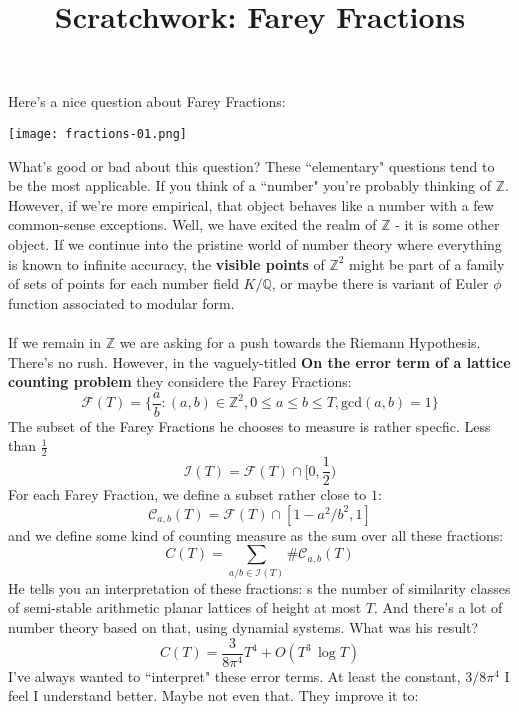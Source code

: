 \documentclass[12pt]{article}
\title{Scratchwork: Farey Fractions}
\date{}
\begin{document}

\sffamily

\maketitle

\noindent Here's a nice question about Farey Fractions:

\newpage

\texttt{[image: fractions-01.png]} 

\newpage

\noindent What's good or bad about this question?  These ``elementary" questions tend to be the most applicable.  If you think of a ``number" you're probably thinking of $\mathbb{Z}$.  However, if we're more empirical, that object behaves like a number with a few common-sense exceptions.  Well, we have exited the realm of $\mathbb{Z}$ - it is some other object.  If we continue into the pristine world of number theory where everything is known to infinite accuracy, the \textbf{visible points} of $\mathbb{Z}^2$ might be part of a family of  sets of points for each number field $K/\mathbb{Q}$, or maybe there is variant of Euler $\phi$ function associated to modular form.  \\ \\
If we remain in $\mathbb{Z}$ we are asking for a push towards the Riemann Hypothesis.  There's no rush.  However, in the vaguely-titled \textbf{On the error term of a lattice counting problem} they considere the Farey Fractions:
$$ \mathcal{F}(T) = \{ \frac{a}{b}: (a,b) \in \mathbb{Z}^2 , 0 \leq a \leq b \leq T , \mathrm{gcd}(a,b) = 1 \} $$
The subset of the Farey Fractions he chooses to measure is rather specfic.  Less than $\frac{1}{2}$
$$ \mathcal{I}(T) = \mathcal{F}(T) \cap [0, \frac{1}{2}) $$
For each Farey Fraction, we define a subset rather close to $1$:
$$ \mathcal{C}_{a,b} (T) = \mathcal{F}(T) \cap [1 - a^2/b^2, 1] $$
and we define some kind of counting measure as the sum over all these fractions:
$$ C(T) = \sum_{a/b \in \mathcal{I}(T)} \# \mathcal{C}_{a,b}(T) $$
He tells you an interpretation of these fractions: {\color{purple!50!green}s the number of similarity classes of semi-stable arithmetic planar lattices of height
at most $T$}.  And there's a lot of number theory based on that, using dynamial systems.  What was his result?
$$ C(T) = \frac{3}{8 \pi^4 }T^4 + O(T^3 \, \log T) $$
I've always wanted to ``interpret" these error terms.  At least the constant, $3/8\pi^4$ I feel I understand better.  Maybe not even that.  They improve it to:
\end{document}
